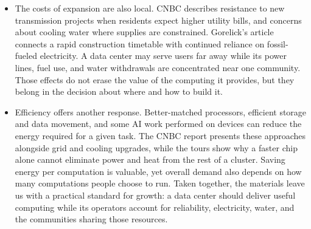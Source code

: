 \documentclass[10pt]{article}
\begin{document}
\begin{itemize}[leftmargin=1.25em, itemsep=0.3em, parsep=0pt, topsep=0pt]
    \item The costs of expansion are also local. CNBC describes resistance to new transmission projects when residents expect higher utility bills, and concerns about cooling water where supplies are constrained. Gorelick's article connects a rapid construction timetable with continued reliance on fossil-fueled electricity. A data center may serve users far away while its power lines, fuel use, and water withdrawals are concentrated near one community. Those effects do not erase the value of the computing it provides, but they belong in the decision about where and how to build it.

    \item Efficiency offers another response. Better-matched processors, efficient storage and data movement, and some AI work performed on devices can reduce the energy required for a given task. The CNBC report presents these approaches alongside grid and cooling upgrades, while the tours show why a faster chip alone cannot eliminate power and heat from the rest of a cluster. Saving energy per computation is valuable, yet overall demand also depends on how many computations people choose to run. Taken together, the materials leave us with a practical standard for growth: a data center should deliver useful computing while its operators account for reliability, electricity, water, and the communities sharing those resources.
\end{itemize}

\end{document}

